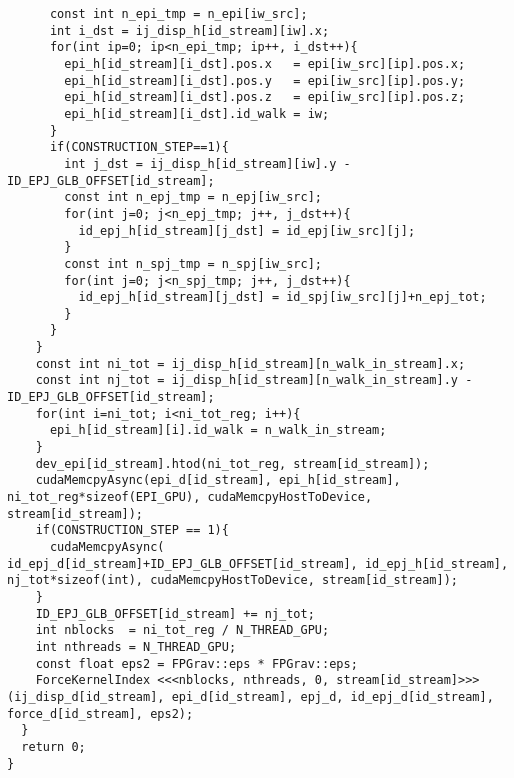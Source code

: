 \documentclass[10pt,onecolumn,a4paper,fleqn]{article}
\begin{document}
\begin{mdframed}[
    backgroundcolor=bg,
    topline=false,
    bottomline=false,
    leftline=false,
    rightline=false]
\begin{verbatim}
      const int n_epi_tmp = n_epi[iw_src];
      int i_dst = ij_disp_h[id_stream][iw].x;
      for(int ip=0; ip<n_epi_tmp; ip++, i_dst++){
        epi_h[id_stream][i_dst].pos.x   = epi[iw_src][ip].pos.x;
        epi_h[id_stream][i_dst].pos.y   = epi[iw_src][ip].pos.y;
        epi_h[id_stream][i_dst].pos.z   = epi[iw_src][ip].pos.z;
        epi_h[id_stream][i_dst].id_walk = iw;
      }
      if(CONSTRUCTION_STEP==1){
        int j_dst = ij_disp_h[id_stream][iw].y - ID_EPJ_GLB_OFFSET[id_stream];
        const int n_epj_tmp = n_epj[iw_src];
        for(int j=0; j<n_epj_tmp; j++, j_dst++){
          id_epj_h[id_stream][j_dst] = id_epj[iw_src][j];
        }
        const int n_spj_tmp = n_spj[iw_src];
        for(int j=0; j<n_spj_tmp; j++, j_dst++){
          id_epj_h[id_stream][j_dst] = id_spj[iw_src][j]+n_epj_tot;
        }
      }
    }
    const int ni_tot = ij_disp_h[id_stream][n_walk_in_stream].x;
    const int nj_tot = ij_disp_h[id_stream][n_walk_in_stream].y - ID_EPJ_GLB_OFFSET[id_stream];
    for(int i=ni_tot; i<ni_tot_reg; i++){
      epi_h[id_stream][i].id_walk = n_walk_in_stream;
    }
    dev_epi[id_stream].htod(ni_tot_reg, stream[id_stream]);
    cudaMemcpyAsync(epi_d[id_stream], epi_h[id_stream], ni_tot_reg*sizeof(EPI_GPU), cudaMemcpyHostToDevice, stream[id_stream]);
    if(CONSTRUCTION_STEP == 1){
      cudaMemcpyAsync( id_epj_d[id_stream]+ID_EPJ_GLB_OFFSET[id_stream], id_epj_h[id_stream], nj_tot*sizeof(int), cudaMemcpyHostToDevice, stream[id_stream]);
    }
    ID_EPJ_GLB_OFFSET[id_stream] += nj_tot;
    int nblocks  = ni_tot_reg / N_THREAD_GPU;
    int nthreads = N_THREAD_GPU;
    const float eps2 = FPGrav::eps * FPGrav::eps;
    ForceKernelIndex <<<nblocks, nthreads, 0, stream[id_stream]>>> (ij_disp_d[id_stream], epi_d[id_stream], epj_d, id_epj_d[id_stream], force_d[id_stream], eps2);
  }
  return 0;
}
  \end{verbatim}
\end{mdframed}

\end{document}
